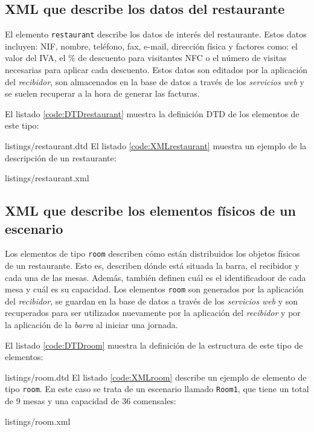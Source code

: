 \subsection{\acs{XML} que describe los datos del restaurante}
El elemento \texttt{restaurant} describe los datos de interés del restaurante.
Estos datos incluyen: NIF, nombre, teléfono, fax, e-mail, dirección física y
factores como: el valor del IVA, el \% de descuento para visitantes \acs{NFC}
o el número de visitas necesarias para aplicar cada descuento. Estos datos
son editados por la aplicación del \emph{recibidor}, son almacenados en la
base de datos a través de los \emph{servicios web} y se suelen recuperar a la
hora de generar las facturas.

El listado \ref{code:DTDrestaurant} muestra la definición \acs{DTD} de los 
elementos de este tipo:

{listings/restaurant.dtd}
El listado \ref{code:XMLrestaurant} muestra un ejemplo de la descripción de
un restaurante:

{listings/restaurant.xml}

\subsection{\acs{XML} que describe los elementos físicos de un escenario}
Los elementos de tipo \texttt{room} describen cómo están distribuidos los
objetos físicos de un restaurante. Esto es, describen dónde está situada la
barra, el recibidor y cada una de las mesas. Además, también definen cuál es
el identificadoor de cada mesa y cuál es su capacidad. Los elementos
\texttt{room} son generados por la aplicación del \emph{recibidor}, se
guardan en la base de datos a través de los \emph{servicios web} y son
recuperados para ser utilizados nuevamente por la aplicación del
\emph{recibidor} y por la aplicación de la \emph{barra} al iniciar una
jornada.

El listado \ref{code:DTDroom} muestra la definición de la estructura de este 
tipo de elementos:

{listings/room.dtd}
El listado \ref{code:XMLroom} describe un ejemplo de elemento de tipo
\texttt{room}. En este caso se trata de un escenario llamado \texttt{Room1},
que tiene un total de 9 mesas y una capacidad de 36 comensales:

{listings/room.xml}

